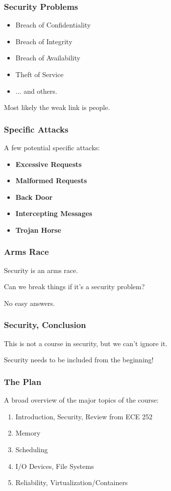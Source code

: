 \begin{frame}
\frametitle{Security Problems}

\begin{itemize}
	\item Breach of Confidentiality
	\item Breach of Integrity
	\item Breach of Availability
	\item Theft of Service
	\item ... and others.
\end{itemize}

Most likely the weak link is people.

\end{frame}


\begin{frame}
\frametitle{Specific Attacks}
A few potential specific attacks:

\begin{itemize}
	\item \textbf{Excessive Requests}
	\item \textbf{Malformed Requests}
	\item \textbf{Back Door}
	\item \textbf{Intercepting Messages}
	\item \textbf{Trojan Horse}
\end{itemize}


\end{frame}


\begin{frame}
\frametitle{Arms Race}

Security is an arms race.

Can we break things if it's a security problem?

No easy answers.


\end{frame}


\begin{frame}
\frametitle{Security, Conclusion}

This is not a course in security, but we can't ignore it.

Security needs to be included from the beginning!


\end{frame}


\begin{frame}
\frametitle{The Plan}

A broad overview of the major topics of the course:

\begin{enumerate}
	\item Introduction, Security, Review from ECE 252
	\item Memory
	\item Scheduling
	\item I/O Devices, File Systems
	\item Reliability, Virtualization/Containers
\end{enumerate}

\end{frame}





